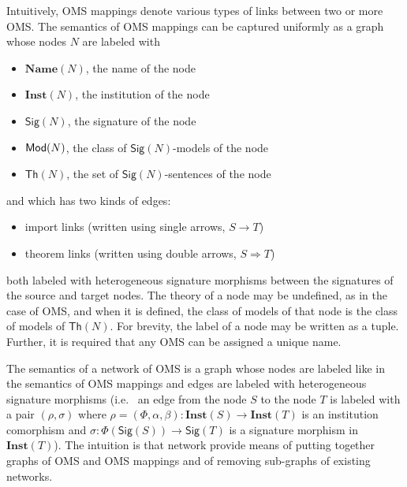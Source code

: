 \documentclass[10pt,fleqn,final]{scrreprt}
\newcommand{\Sig}{\mathsf{Sig}}
\renewcommand{\Th}{\mathsf{Th}}
\newcommand{\Inst}{\ensuremath{\mathbf{Inst}}}
\newcommand{\Name}{\ensuremath{\mathbf{Name}}}
\newenvironment{definitions}[0]{\medskip }{}
\begin{document}
\begin{definitions}
Intuitively, OMS mappings denote various types of links between two or more OMS. 
The semantics of OMS mappings can be captured uniformly as a graph whose nodes $N$ are labeled with 
\begin{itemize}
 \item $\Name(N)$, the name of the node
 \item $\Inst(N)$, the institution of the node
 \item $\Sig(N)$, the signature of the node
 \item $\mathsf{Mod}(N)$, the class of $\Sig(N)$-models of the node
 \item $\Th(N)$, the set of $\Sig(N)$-sentences of the node
\end{itemize}
and 
which has two kinds of edges:
\begin{itemize}
  \item import links (written using single arrows, $S\rightarrow T$)
  \item theorem links (written using double arrows, $S\Rightarrow T$)
\end{itemize}
both labeled with 
heterogeneous signature morphisms between the signatures of the source and target nodes.
The theory of a node  may be undefined, as in the case of OMS, and when it is defined, 
the class of models of that node is the class of models of $\Th(N)$. 
For brevity,  the label of a node may be written as a tuple. Further, it is required that  any OMS can be assigned a unique name. 

The semantics of a network of OMS is a graph
whose nodes are labeled like in the semantics of OMS mappings and 
edges are labeled with heterogeneous signature morphisms (i.e.~ 
an edge from the node $S$ to the node $T$ is labeled with a pair 
$(\rho, \sigma)$ where $\rho=(\Phi,\alpha,\beta):\Inst(S)\to\Inst(T)$ is an institution comorphism and
$\sigma:\Phi(\Sig(S))\to\Sig(T)$ is a signature morphism in $\Inst(T)$). 
The intuition is that
network provide means of putting together graphs of OMS and OMS mappings
and of removing sub-graphs of existing networks. 


\end{definitions}
\end{document}

